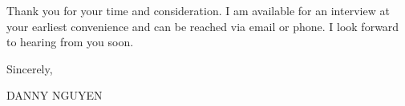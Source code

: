 \documentclass[letterpaper,11pt]{article}
\begin{document}
\vspace{10pt}

Thank you for your time and consideration. I am available for an interview at your earliest convenience and can be reached via email or phone. I look forward to hearing from you soon.


\vspace{20pt}

Sincerely, \\
\vspace{40pt}

DANNY NGUYEN
\end{document}

